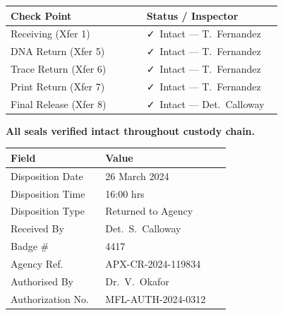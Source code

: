 \documentclass[letterpaper,11pt]{article}
\begin{document}
\vspace{5pt}

\noindent
\begin{minipage}[t]{0.485\linewidth}
\begin{tcolorbox}[sealbox, title={\faLock\quad SEAL INTEGRITY RECORD}]
\sffamily\small
\renewcommand{\arraystretch}{1.25}
\begin{tabular}{@{}p{0.47\linewidth}p{0.47\linewidth}@{}}
  \textbf{Check Point} & \textbf{Status / Inspector} \\
  \midrule
  Receiving (Xfer 1) & \textcolor{GreenSeal}{\faCheck~Intact} --- T.\ Fernandez \\
  DNA Return (Xfer 5) & \textcolor{GreenSeal}{\faCheck~Intact} --- T.\ Fernandez \\
  Trace Return (Xfer 6) & \textcolor{GreenSeal}{\faCheck~Intact} --- T.\ Fernandez \\
  Print Return (Xfer 7) & \textcolor{GreenSeal}{\faCheck~Intact} --- T.\ Fernandez \\
  Final Release (Xfer 8) & \textcolor{GreenSeal}{\faCheck~Intact} --- Det.\ Calloway \\
\end{tabular}
\par\vspace{3pt}
{\footnotesize\color{GreenSeal}\bfseries All seals verified intact throughout custody chain.}
\end{tcolorbox}
\end{minipage}%
\hfill
\begin{minipage}[t]{0.485\linewidth}
\begin{tcolorbox}[sectionbox, title={\faFolderOpen\quad FINAL DISPOSITION}]
\sffamily\small
\renewcommand{\arraystretch}{1.25}
\begin{tabular}{@{}p{0.40\linewidth}p{0.53\linewidth}@{}}
  \textbf{Field} & \textbf{Value} \\
  \midrule
  Disposition Date & 26 March 2024 \\
  Disposition Time & 16:00 hrs \\
  Disposition Type & Returned to Agency \\
  Received By & Det.\ S.\ Calloway \\
  Badge \# & 4417 \\
  Agency Ref. & APX-CR-2024-119834 \\
  Authorised By & Dr.\ V.\ Okafor \\
  Authorization No. & MFL-AUTH-2024-0312 \\
\end{tabular}
\end{tcolorbox}
\end{minipage}
\end{document}
